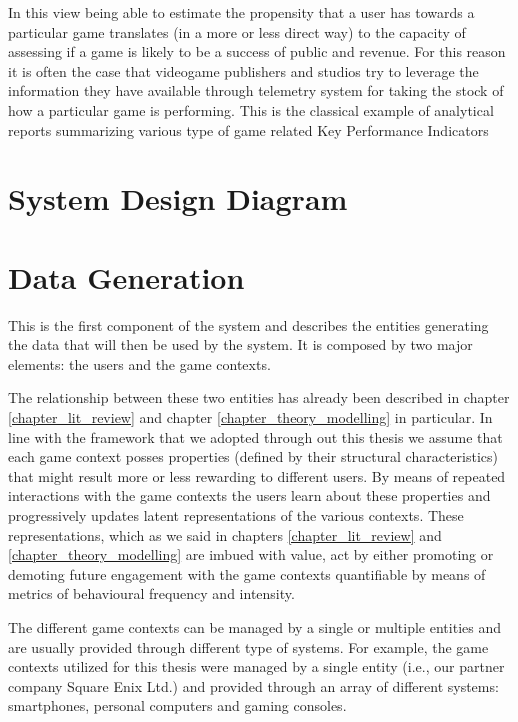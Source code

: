 In this view being able to estimate the propensity that a user has towards a particular game translates (in a more or less direct way) to the capacity of assessing if a game is likely to be a success of public and revenue. For this reason it is often the case that videogame publishers and studios try to leverage the information they have available through telemetry system for taking the stock of how a particular game is performing. This is the classical example of analytical reports summarizing various type of game related Key Performance Indicators \cite{el2016game} 

\section{System Design Diagram}
\label{pipeline}


\section{Data Generation}
This is the first component of the system and describes the entities generating the data that will then be used by the system. It is composed by two major elements: the users and the game contexts. 

The relationship between these two entities has already been described in chapter \ref{chapter_lit_review} and chapter \ref{chapter_theory_modelling} in particular. In line with the framework that we adopted through out this thesis we assume that each game context posses properties (defined by their structural characteristics) that might result more or less rewarding to different users. By means of repeated interactions with the game contexts the users learn about these properties and progressively updates latent representations of the various contexts. These representations, which as we said in chapters \ref{chapter_lit_review} and \ref{chapter_theory_modelling} are imbued with value, act by either promoting or demoting future engagement with the game contexts quantifiable by means of metrics of behavioural frequency and intensity.

The different game contexts can be managed by a single or multiple entities and are usually provided through different type of systems. For example, the game contexts utilized for this thesis were managed by a single entity (i.e., our partner company Square Enix Ltd.) and provided through an array of different systems: smartphones, personal computers and gaming consoles.

